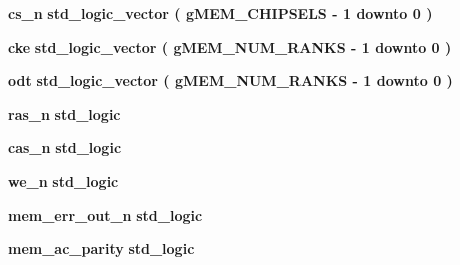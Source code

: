 \begin{DoxyCompactItemize}
\item 
{\bf cs\+\_\+n} {\bfseries \textcolor{comment}{std\+\_\+logic\+\_\+vector}\textcolor{vhdlchar}{ }\textcolor{vhdlchar}{(}\textcolor{vhdlchar}{ }\textcolor{vhdlchar}{ }\textcolor{vhdlchar}{ }\textcolor{vhdlchar}{ }{\bfseries {\bf g\+M\+E\+M\+\_\+\+C\+H\+I\+P\+S\+E\+LS}} \textcolor{vhdlchar}{-\/}\textcolor{vhdlchar}{ } \textcolor{vhdldigit}{1} \textcolor{vhdlchar}{ }\textcolor{keywordflow}{downto}\textcolor{vhdlchar}{ }\textcolor{vhdlchar}{ } \textcolor{vhdldigit}{0} \textcolor{vhdlchar}{ }\textcolor{vhdlchar}{)}\textcolor{vhdlchar}{ }} 
\item 
{\bf cke} {\bfseries \textcolor{comment}{std\+\_\+logic\+\_\+vector}\textcolor{vhdlchar}{ }\textcolor{vhdlchar}{(}\textcolor{vhdlchar}{ }\textcolor{vhdlchar}{ }\textcolor{vhdlchar}{ }\textcolor{vhdlchar}{ }{\bfseries {\bf g\+M\+E\+M\+\_\+\+N\+U\+M\+\_\+\+R\+A\+N\+KS}} \textcolor{vhdlchar}{-\/}\textcolor{vhdlchar}{ } \textcolor{vhdldigit}{1} \textcolor{vhdlchar}{ }\textcolor{keywordflow}{downto}\textcolor{vhdlchar}{ }\textcolor{vhdlchar}{ } \textcolor{vhdldigit}{0} \textcolor{vhdlchar}{ }\textcolor{vhdlchar}{)}\textcolor{vhdlchar}{ }} 
\item 
{\bf odt} {\bfseries \textcolor{comment}{std\+\_\+logic\+\_\+vector}\textcolor{vhdlchar}{ }\textcolor{vhdlchar}{(}\textcolor{vhdlchar}{ }\textcolor{vhdlchar}{ }\textcolor{vhdlchar}{ }\textcolor{vhdlchar}{ }{\bfseries {\bf g\+M\+E\+M\+\_\+\+N\+U\+M\+\_\+\+R\+A\+N\+KS}} \textcolor{vhdlchar}{-\/}\textcolor{vhdlchar}{ } \textcolor{vhdldigit}{1} \textcolor{vhdlchar}{ }\textcolor{keywordflow}{downto}\textcolor{vhdlchar}{ }\textcolor{vhdlchar}{ } \textcolor{vhdldigit}{0} \textcolor{vhdlchar}{ }\textcolor{vhdlchar}{)}\textcolor{vhdlchar}{ }} 
\item 
{\bf ras\+\_\+n} {\bfseries \textcolor{comment}{std\+\_\+logic}\textcolor{vhdlchar}{ }} 
\item 
{\bf cas\+\_\+n} {\bfseries \textcolor{comment}{std\+\_\+logic}\textcolor{vhdlchar}{ }} 
\item 
{\bf we\+\_\+n} {\bfseries \textcolor{comment}{std\+\_\+logic}\textcolor{vhdlchar}{ }} 
\item 
{\bf mem\+\_\+err\+\_\+out\+\_\+n} {\bfseries \textcolor{comment}{std\+\_\+logic}\textcolor{vhdlchar}{ }} 
\item 
{\bf mem\+\_\+ac\+\_\+parity} {\bfseries \textcolor{comment}{std\+\_\+logic}\textcolor{vhdlchar}{ }} 
\item 

\end{DoxyCompactItemize}

